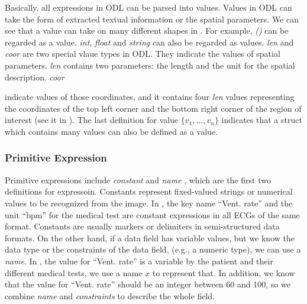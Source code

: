 Basically, all expressions in ODL can be parsed into values. Values 
in ODL can take the form of extracted textual information or the spatial parameters. 
	We can see that a value can take on many different shapes 
in . For example, {\em ()} can be regarded as a value.
{\em int}, 
{\em float} and {\em string} can also be regarded as values.
{\em len} and {\em coor} are two special vlaue types in ODL. They indicate 
the values of spatial parameters. {\em len} contains two parameters: the  
length and the unit for the spatial description. {\em coor} {indicate  values of those
coordinates, and it contains four {\em len} values representing 
the coordinates of the top left corner and the bottom right corner of 
the region of interest (see it in ). The last definition for value  {\em $\{v_1, ..., v_n\}$} indicates that a struct which contains many values can also be defined as a value. 

\subsubsection{Primitive Expression}
Primitive expressions include {\em constant} and {\em name} , which are the first two definitions for expressoin.
Constants represent fixed-valued strings or numerical values to be recognized from the 
image. In , the key name ``Vent. rate'' and the unit 
``bpm'' for the medical test are constant expressions in all ECGs of the same
format. Constants are usually markers or delimiters in semi-structured
data formats.
On the other hand, if a data field has variable values,
but we know the data type or the constraints of the data field,
(e.g., a numeric type), we can use a {\em name}. 
In , the value for ``Vent. rate'' is a variable by
the patient and their different medical tests, we use a name $x$ to represent that. 
In addition, we know that the value for ``Vent. rate'' should be an integer 
between 60 and 100, so we combine {\em name} and {\em constraints} 
to describe the whole field. 

}
